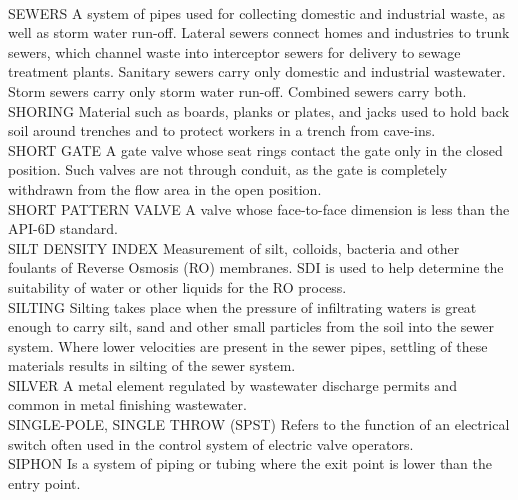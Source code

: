 \vspace{0.3cm}\\
SEWERS
A system of pipes used for collecting domestic and industrial waste, as well as storm water run-off. Lateral sewers connect homes and industries to trunk sewers, which channel waste into interceptor sewers for delivery to sewage treatment plants. Sanitary sewers carry only domestic and industrial wastewater. Storm sewers carry only storm water run-off. Combined sewers carry both.
\vspace{0.3cm}\\
SHORING
Material such as boards, planks or plates, and jacks used to hold back soil around trenches and to protect workers in a trench from cave-ins. 
\vspace{0.3cm}\\
SHORT GATE
A gate valve whose seat rings contact the gate only in the closed position. Such valves are not through conduit, as the gate is completely withdrawn from the flow area in the open position.
\vspace{0.3cm}\\
SHORT PATTERN VALVE
A valve whose face-to-face dimension is less than the API-6D standard.
\vspace{0.3cm}\\
SILT DENSITY INDEX
Measurement of silt, colloids, bacteria and other foulants of Reverse Osmosis (RO) membranes. SDI is used to help determine the suitability of water or other liquids for the RO process.
\vspace{0.3cm}\\
SILTING
Silting takes place when the pressure of infiltrating waters is great enough to carry silt, sand and other small particles from the soil into the sewer system. Where lower velocities are present in the sewer pipes, settling of these materials results in silting of the sewer system. 
\vspace{0.3cm}\\
SILVER
A metal element regulated by wastewater discharge permits and common in metal finishing wastewater.
\vspace{0.3cm}\\
SINGLE-POLE, SINGLE THROW (SPST)
Refers to the function of an electrical switch often used in the control system of electric valve operators.
\vspace{0.3cm}\\
SIPHON
Is a system of piping or tubing where the exit point is lower than the entry point.
\vspace{0.3cm}\\
